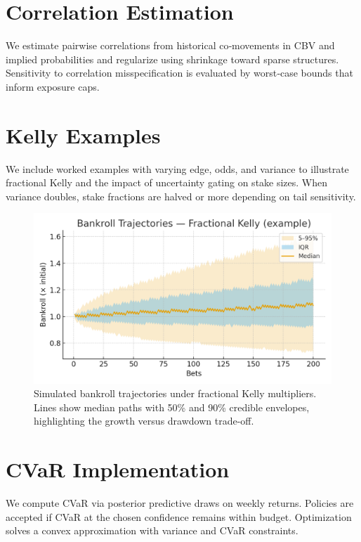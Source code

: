 
\section{Correlation Estimation}
We estimate pairwise correlations from historical co‑movements in CBV and implied probabilities and regularize using shrinkage toward sparse structures. Sensitivity to correlation misspecification is evaluated by worst‑case bounds that inform exposure caps.

\section{Kelly Examples}
We include worked examples with varying edge, odds, and variance to illustrate fractional Kelly and the impact of uncertainty gating on stake sizes. When variance doubles, stake fractions are halved or more depending on tail sensitivity.

\begin{figure}[t]
  \centering
  \includegraphics[width=0.9\linewidth]{../figures/bankroll_trajectories.png}
  \caption[Fractional Kelly bankroll trajectories]{Simulated bankroll trajectories under fractional Kelly multipliers. Lines show median paths with 50\% and 90\% credible envelopes, highlighting the growth versus drawdown trade-off.}
  \label{fig:bankroll-trajectories}
\end{figure}

\section{CVaR Implementation}
We compute CVaR via posterior predictive draws on weekly returns. Policies are accepted if CVaR at the chosen confidence remains within budget. Optimization solves a convex approximation with variance and CVaR constraints.

